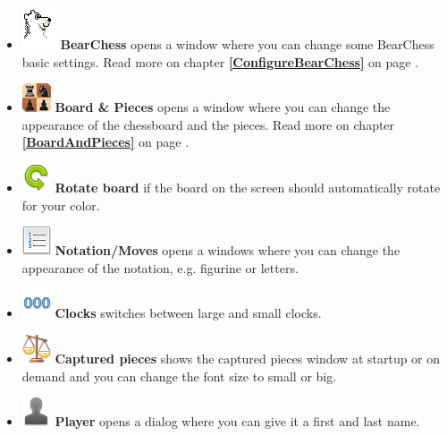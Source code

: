 \documentclass[11pt,a4paper]{article}
\begin{document}
	\begin{itemize}
		\item  \includegraphics[scale=0.6]{BearChessIcon.png} \textbf{BearChess} opens a window where you can change some BearChess basic settings.  Read more on chapter \textbf{\ref{ConfigureBearChess}  } on page \pageref{ConfigureBearChess}.
		\item  \includegraphics[scale=0.9]{Board2DPieces32.png} \textbf{Board \& Pieces} opens a window where you can change the appearance of the chessboard and the pieces.  Read more on chapter \textbf{\ref{BoardAndPieces}  } on page \pageref{BoardAndPieces}.
		\item \includegraphics[scale=0.5]{arrow_rotate_anticlockwise.png}  \textbf{Rotate board} if the board on the screen should automatically rotate for your color.
		\item  \includegraphics[scale=0.5]{text_list_numbers.png} \textbf{Notation/Moves} opens a windows where you can change the appearance of the notation, e.g. figurine or letters.
		\item  \includegraphics[scale=0.5]{digit_separator.png}  \textbf{Clocks} switches between large and small clocks.
		\item  \includegraphics[scale=0.5]{balance_unbalance.png}  \textbf{Captured pieces} shows the captured pieces window at startup or on demand and you can change the font size to small or big.
		\item  \includegraphics[scale=0.5]{user_silhouette.png}  \textbf{Player} opens a dialog where you can give it a first and last name.	

\end{itemize}
\end{document}
